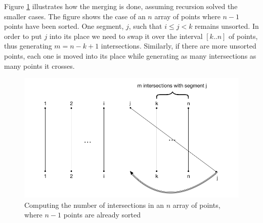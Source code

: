 Figure \ref{fig:pointInd} illustrates how the merging is done, assuming recursion solved the smaller cases. 
The figure shows the case of an $n$ array of points where $n-1$ points have been sorted.
One segment, $j$, such that $i \leq j < k$ remains unsorted.
In order to put $j$ into its place we need to swap it over the interval $[k .. n]$ of points, thus generating $m = n - k + 1$ intersections.
Similarly, if there are more unsorted points, each one is moved into its place while generating as many intersections as many points it crosses.

\begin{figure}[H]
    \centering
    \includegraphics[scale=0.35]{1b-intersections-ind}
    \caption{Computing the number of intersections in an $n$ array of points, where $n-1$ points are already sorted}
    \label{fig:pointInd}
\end{figure}

